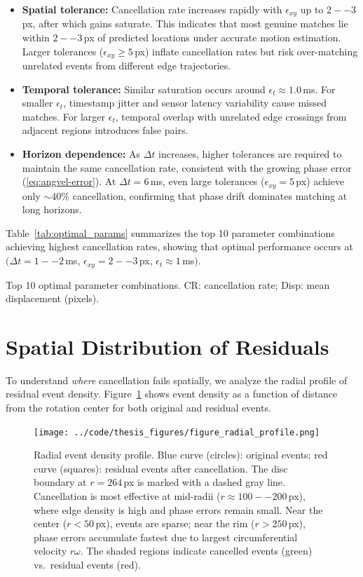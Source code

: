 \begin{itemize}
\item \textbf{Spatial tolerance:} Cancellation rate increases rapidly with $\epsilon_{xy}$ up to $2--3$\,px, after which gains saturate. This indicates that most genuine matches lie within $2--3$\,px of predicted locations under accurate motion estimation. Larger tolerances ($\epsilon_{xy} \geq 5$\,px) inflate cancellation rates but risk over-matching unrelated events from different edge trajectories.
\item \textbf{Temporal tolerance:} Similar saturation occurs around $\epsilon_t \approx 1.0$\,ms. For smaller $\epsilon_t$, timestamp jitter and sensor latency variability cause missed matches. For larger $\epsilon_t$, temporal overlap with unrelated edge crossings from adjacent regions introduces false pairs.
\item \textbf{Horizon dependence:} As $\Delta t$ increases, higher tolerances are required to maintain the same cancellation rate, consistent with the growing phase error (\eqref{eq:angvel-error}). At $\Delta t=6$\,ms, even large tolerances ($\epsilon_{xy}=5$\,px) achieve only $\sim 40\%$ cancellation, confirming that phase drift dominates matching at long horizons.
\end{itemize}

Table~\ref{tab:optimal_params} summarizes the top 10 parameter combinations achieving highest cancellation rates, showing that optimal performance occurs at $(\Delta t=1--2$\,ms, $\epsilon_{xy}=2--3$\,px, $\epsilon_t \approx 1$\,ms$)$.

\begin{table}[t]
  \centering
  \caption{Top 10 optimal parameter combinations. CR: cancellation rate; Disp: mean displacement (pixels).}
  \label{tab:optimal_params}
  \small
  
\end{table}

\section{Spatial Distribution of Residuals}

To understand \emph{where} cancellation fails spatially, we analyze the radial profile of residual event density. Figure~\ref{fig:radial_profile} shows event density as a function of distance from the rotation center for both original and residual events.

\begin{figure}[t]
  \centering
  \texttt{[image: ../code/thesis\_figures/figure\_radial\_profile.png]}
  \caption{Radial event density profile. Blue curve (circles): original events; red curve (squares): residual events after cancellation. The disc boundary at $r=264$\,px is marked with a dashed gray line. Cancellation is most effective at mid-radii ($r \approx 100--200$\,px), where edge density is high and phase errors remain small. Near the center ($r < 50$\,px), events are sparse; near the rim ($r > 250$\,px), phase errors accumulate fastest due to largest circumferential velocity $r\omega$. The shaded regions indicate cancelled events (green) vs.\ residual events (red).}
  \label{fig:radial_profile}
\end{figure}

